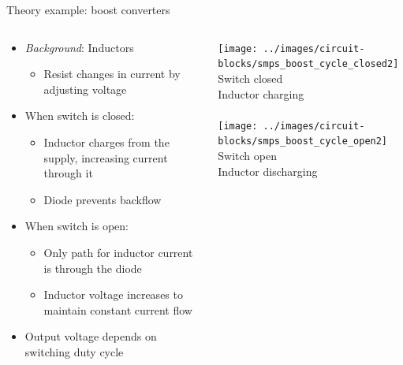\documentclass{beamer}
\begin{document}
\begin{frame}{Theory example: boost converters}
  \begin{columns}[T]
    \begin{column}{.6\textwidth}
      \begin{itemize}
        \item {\em Background}: Inductors
        \begin{itemize}
          \item Resist changes in current by adjusting voltage
        \end{itemize}
        \item When switch is closed:
        \begin{itemize}
          \item Inductor charges from the supply, increasing current through it
          \item Diode prevents backflow
        \end{itemize}
        \item When switch is open:
        \begin{itemize}
          \item Only path for inductor current is through the diode
          \item Inductor voltage increases to maintain constant current flow
        \end{itemize}
        \item Output voltage depends on switching duty cycle
      \end{itemize}
    \end{column}

    \begin{column}{0.4\textwidth} \centering
      \texttt{[image: ../images/circuit-blocks/smps\_boost\_cycle\_closed2]} \\
      Switch closed \\
      {\tiny Inductor charging} \\
      ~ \\
      \texttt{[image: ../images/circuit-blocks/smps\_boost\_cycle\_open2]} \\
      Switch open \\
      {\tiny Inductor discharging}
    \end{column}
  \end{columns}
\end{frame}
\end{document}
